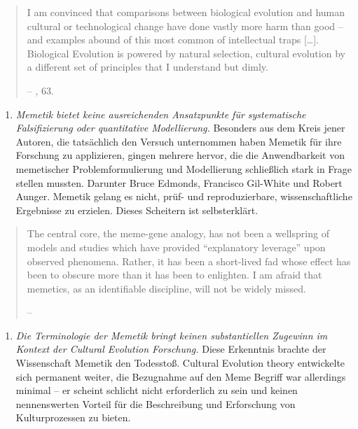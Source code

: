 \documentclass[openany,twoside,twocolumn]{book}
\providecommand{\tightlist}{%
  \setlength{\itemsep}{0pt}\setlength{\parskip}{0pt}}
\begin{document}
\begin{quote}
I am convinced that comparisons between biological evolution and human
cultural or technological change have done vastly more harm than good --
and examples abound of this most common of intellectual traps
{[}\ldots{}{]}. Biological Evolution is powered by natural selection,
cultural evolution by a different set of principles that I understand
but dimly.

-- \textcite{gould_pandas_1991}, 63.
\end{quote}

\begin{enumerate}
\def\labelenumi{\arabic{enumi}.}
\setcounter{enumi}{1}
\tightlist
\item
  \emph{Memetik bietet keine ausreichenden Ansatzpunkte für
  systematische Falsifizierung oder quantitative Modellierung.}
  Besonders aus dem Kreis jener Autoren, die tatsächlich den Versuch
  unternommen haben Memetik für ihre Forschung zu applizieren, gingen
  mehrere hervor, die die Anwendbarkeit von memetischer
  Problemformulierung und Modellierung schließlich stark in Frage
  stellen mussten. Darunter Bruce Edmonds, Francisco Gil-White und
  Robert Aunger. Memetik gelang es nicht, prüf- und reproduzierbare,
  wissenschaftliche Ergebnisse zu erzielen. Dieses Scheitern ist
  selbsterklärt.
\end{enumerate}

\begin{quote}
The central core, the meme-gene analogy, has not been a wellspring of
models and studies which have provided ``explanatory leverage'' upon
observed phenomena. Rather, it has been a short-lived fad whose effect
has been to obscure more than it has been to enlighten. I am afraid that
memetics, as an identifiable discipline, will not be widely missed.

-- \textcite{edmonds_revealed_2005}
\end{quote}

\begin{enumerate}
\def\labelenumi{\arabic{enumi}.}
\setcounter{enumi}{2}
\tightlist
\item
  \emph{Die Terminologie der Memetik bringt keinen substantiellen
  Zugewinn im Kontext der Cultural Evolution Forschung.} Diese
  Erkenntnis brachte der Wissenschaft Memetik den Todesstoß. Cultural
  Evolution theory entwickelte sich permanent weiter, die Bezugnahme auf
  den Meme Begriff war allerdings minimal -- er scheint schlicht nicht
  erforderlich zu sein und keinen nennenswerten Vorteil für die
  Beschreibung und Erforschung von Kulturprozessen zu bieten.
\end{enumerate}
\end{document}
